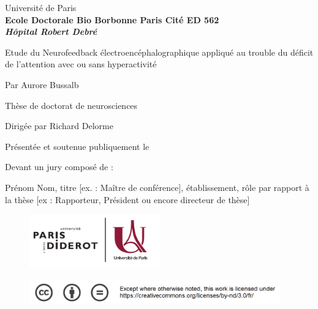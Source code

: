 
\begin{titlepage}

\vskip 1in

\begin{center}
{\LARGE Université de Paris} \\
\vskip 0in
\textbf{Ecole Doctorale Bio Borbonne Paris Cité ED 562} \\
\vskip 0in
\textbf{\textit{Hôpital Robert Debré}} \\
\vskip 0.3in

\Huge Etude du Neurofeedback électroencéphalographique appliqué au trouble du déficit de l'attention avec ou sans hyperactivité

\vskip 0.3in

%

{\Large Par Aurore Bussalb} \\

\vskip 0.3in

{\large Thèse de doctorat de neurosciences} \\

\vskip 0.2in

{\large Dirigée par Richard Delorme} \\

\vskip 0.1in

{\normalsize Présentée et soutenue publiquement le} \\
\vskip 0.1in

\end{center}

Devant un jury composé de : %

Prénom Nom,  titre [ex. : Maître de conférence],  établissement, rôle par rapport à la thèse [ex : Rapporteur, Président ou encore directeur de thèse]

\begin{figure}[t]
	\includegraphics[width=56.1mm]{logos/Logo_Universite_Paris.png} 
\end{figure}

\begin{figure}[b]
	\includegraphics[width=108.2mm]{logos/creative_commons_pas_de_modifs.png} 
\end{figure}

\end{titlepage}